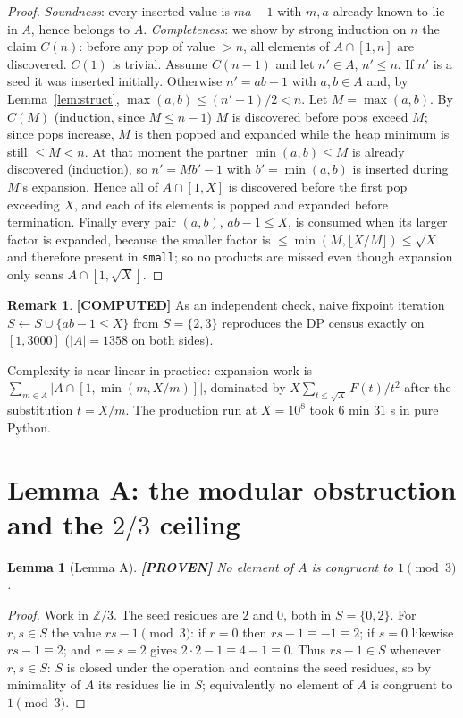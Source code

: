 \documentclass[11pt]{article}
\newtheorem{lemma}[theorem]{Lemma}
\theoremstyle{definition}
\newtheorem{remark}[theorem]{Remark}
\newcommand{\A}{A}
\newcommand{\Z}{\mathbb{Z}}
\newcommand{\F}{F}
\begin{document}
\begin{proof}
\emph{Soundness}: every inserted value is $ma-1$ with $m,a$ already known to
lie in $\A$, hence belongs to $\A$. \emph{Completeness}: we show by strong
induction on $n$ the claim $C(n)$: before any pop of value $>n$, all elements
of $\A\cap[1,n]$ are discovered. $C(1)$ is trivial. Assume $C(n-1)$ and let
$n'\in\A$, $n'\le n$. If $n'$ is a seed it was inserted initially. Otherwise
$n'=ab-1$ with $a,b\in\A$ and, by Lemma~\ref{lem:struct},
$\max(a,b)\le(n'+1)/2<n$. Let $M=\max(a,b)$. By $C(M)$ (induction, since
$M\le n-1$) $M$ is discovered before pops exceed $M$; since pops increase, $M$
is then popped and expanded while the heap minimum is still $\le M<n$. At that
moment the partner $\min(a,b)\le M$ is already discovered (induction), so
$n'=Mb'-1$ with $b'=\min(a,b)$ is inserted during $M$'s expansion. Hence all of
$\A\cap[1,X]$ is discovered before the first pop exceeding $X$, and each of its
elements is popped and expanded before termination. Finally every pair
$(a,b)$, $ab-1\le X$, is consumed when its larger factor is expanded, because
the smaller factor is $\le\min(M,\lfloor X/M\rfloor)\le\sqrt X$ and therefore
present in \texttt{small}; so no products are missed even though expansion only
scans $\A\cap[1,\sqrt X]$.
\end{proof}

\begin{remark}\textbf{[COMPUTED]}
As an independent check, naive fixpoint iteration
$S\leftarrow S\cup\{ab-1\le X\}$ from $S=\{2,3\}$ reproduces the DP census
exactly on $[1,3000]$ ($|\A|=1358$ on both sides).
\end{remark}

Complexity is near-linear in practice: expansion work is
$\sum_{m\in\A}\bigl|\A\cap[1,\min(m,X/m)]\bigr|$, dominated by
$X\sum_{t\le\sqrt X}\F(t)/t^2$ after the substitution $t=X/m$. The production
run at $X=10^8$ took $6$ min $31$ s in pure Python.

\section{Lemma A: the modular obstruction and the \texorpdfstring{$2/3$}{2/3} ceiling}\label{sec:lemmaA}

\begin{lemma}[Lemma A]\label{lem:A}\textbf{[PROVEN]}
No element of $\A$ is congruent to $1\pmod 3$.
\end{lemma}

\begin{proof}
Work in $\Z/3$. The seed residues are $2$ and $0$, both in $S=\{0,2\}$. For
$r,s\in S$ the value $rs-1\pmod3$: if $r=0$ then $rs-1\equiv-1\equiv2$; if
$s=0$ likewise $rs-1\equiv2$; and $r=s=2$ gives $2\cdot2-1\equiv4-1\equiv0$.
Thus $rs-1\in S$ whenever $r,s\in S$: $S$ is closed under the operation and
contains the seed residues, so by minimality of $\A$ its residues lie in $S$;
equivalently no element of $\A$ is congruent to $1\pmod3$.
\end{proof}
\end{document}
